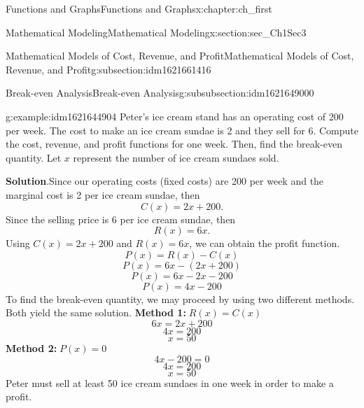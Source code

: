 \documentclass[oneside,10pt,]{book}
\newcommand{\blocktitlefont}{\relax}
\newcommand{\terminology}[1]{\textbf{#1}}
\numberwithin{equation}{section}
\begin{document}
\begin{chapterptx}{Functions and Graphs}{}{Functions and Graphs}{}{}{x:chapter:ch_first}
\begin{sectionptx}{Mathematical Modeling}{}{Mathematical Modeling}{}{}{x:section:sec_Ch1Sec3}
\begin{subsectionptx}{Mathematical Models of Cost, Revenue, and Profit}{}{Mathematical Models of Cost, Revenue, and Profit}{}{}{g:subsection:idm1621661416}
\begin{subsubsectionptx}{Break-even Analysis}{}{Break-even Analysis}{}{}{g:subsubsection:idm1621649000}
\begin{example}{}{g:example:idm1621644904}%
Peter's ice cream stand has an operating cost of \textdollar{}200 per week. The cost to make an ice cream sundae is \textdollar{}2 and they sell for \textdollar{}6. Compute the cost, revenue, and profit functions for one week. Then, find the break-even quantity. Let \(x\) represent the number of ice cream sundaes sold.%
\par\smallskip%
\noindent\textbf{\blocktitlefont Solution}.\hypertarget{g:solution:idm1621644008}{}\quad{}Since our operating costs (fixed costs) are \textdollar{}200 per week and the marginal cost is \textdollar{}2 per ice cream sundae, then%
\begin{equation*}
C(x)=2x+200\text{.}
\end{equation*}
Since the selling price is \textdollar{}6 per ice cream sundae, then%
\begin{equation*}
R(x)=6x\text{.}
\end{equation*}
Using \(C(x)=2x+200\) and \(R(x)=6x\), we can obtain the profit function.%
\begin{equation*}
P(x)=R(x)-C(x)
\end{equation*}
%
\begin{equation*}
P(x)=6x-(2x+200)
\end{equation*}
%
\begin{equation*}
P(x)=6x-2x-200
\end{equation*}
%
\begin{equation*}
P(x)=4x-200
\end{equation*}
To find the break-even quantity, we may proceed by using two different methods. Both yield the same solution.%
\terminology{Method 1:}\(\;R(x)=C(x)\)%
\begin{equation*}
6x=2x+200
\end{equation*}
%
\begin{equation*}
4x=200
\end{equation*}
%
\begin{equation*}
x=50
\end{equation*}
\terminology{Method 2:}\(\;P(x)=0\)%
\begin{equation*}
4x-200=0
\end{equation*}
%
\begin{equation*}
4x=200
\end{equation*}
%
\begin{equation*}
x=50
\end{equation*}
Peter must sell at least 50 ice cream sundaes in one week in order to make a profit.\end{example}

\end{subsubsectionptx}
\end{subsectionptx}
\end{sectionptx}
\end{chapterptx}
\end{document}
